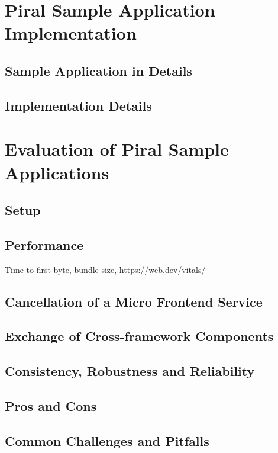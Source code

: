 \documentclass[a4paper]{book}
\begin{document}
\chapter{Piral Sample Application Implementation}
\section{Sample Application in Details}
\section{Implementation Details}


\chapter{Evaluation of Piral Sample Applications}
\section{Setup}
\section{Performance }
Time to first byte, bundle size, \url{https://web.dev/vitals/}
\section{Cancellation of a Micro Frontend Service}
\section{Exchange of Cross-framework Components}
\section{Consistency, Robustness and Reliability}
\section{Pros and Cons}
\section{Common Challenges and Pitfalls}

\end{document}
